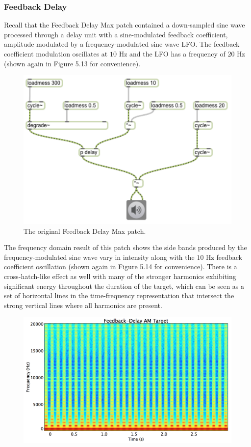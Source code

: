 \documentclass[a4paper,12pt]{report} 	%
\numberwithin{figure}{chapter}
\numberwithin{table}{chapter}
\numberwithin{equation}{chapter}
\begin{document}
\begin{flushleft}
\subsubsection{Feedback Delay}
Recall that the Feedback Delay Max patch contained a down-sampled sine wave processed through a delay unit with a sine-modulated feedback coefficient, amplitude modulated by a frequency-modulated sine wave LFO. The feedback coefficient modulation oscillates at $10$ Hz and the LFO has a frequency of $20$ Hz (shown again in Figure 5.13 for convenience).
\begin{figure}[h!]
\begin{center}
\includegraphics[scale=0.8]{DelayFeedbackAM}
\caption[Original Feedback Delay Max Patch]{The original Feedback Delay Max patch.}
\end{center}
\end{figure}
The frequency domain result of this patch shows the side bands produced by the frequency-modulated sine wave vary in intensity along with the $10$ Hz feedback coefficient oscillation (shown again in Figure 5.14 for convenience). There is a cross-hatch-like effect as well with many of the stronger harmonics exhibiting significant energy throughout the duration of the target, which can be seen as a set of horizontal lines in the time-frequency representation that intersect the strong vertical lines where all harmonics are present.
\begin{figure}[h!]
\begin{center}
\includegraphics[scale=0.35,width=\linewidth]{FeedbackDelayAMTargetSTFT}

\end{center}
\end{figure}
\end{flushleft}
\end{document}
